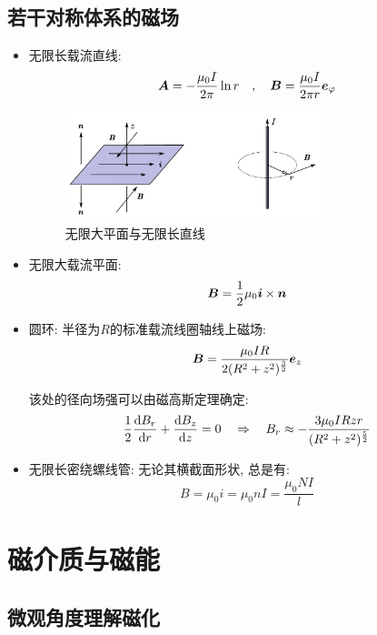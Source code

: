 \subsection{若干对称体系的磁场}

\begin{itemize}
\item 无限长载流直线:
\[\boldsymbol{A}=-\frac{\mu_0 I}{2\pi}\ln r\quad ,\quad \boldsymbol{B}=\frac{\mu_0 I}{2\pi r}\boldsymbol{e}_\varphi\]

\begin{figure}[H]
\centering
\includegraphics[width=0.7\textwidth]{image/7-4-1.png}
\caption{无限大平面与无限长直线}\label{fig7-4-1}
\end{figure}

\item 无限大载流平面:
\[\boldsymbol{B}=\frac{1}{2}\mu_0\boldsymbol{i}\times \boldsymbol{n}\]

\item 圆环: 半径为$R$的标准载流线圈轴线上磁场:
\[\boldsymbol{B}=\frac{\mu_0IR}{2(R^2+z^2)^{\frac{3}{2}}}\boldsymbol{e}_z\]

该处的径向场强可以由磁高斯定理确定:
\[\frac{1}{2}\frac{\textrm{d} B_r}{\textrm{d} r}+\frac{\textrm{d} B_z}{\textrm{d} z}=0\quad \Rightarrow \quad B_r\approx -\frac{3\mu_0IRzr}{(R^2+z^2)^{\frac{5}{2}}}\]

\item 无限长密绕螺线管: 无论其横截面形状, 总是有:
\[B=\mu_0 i=\mu_0 nI=\frac{\mu_0 NI}{l}\]
\end{itemize}


\npg{-2cm}

\section{磁介质与磁能}

\subsection{微观角度理解磁化}

